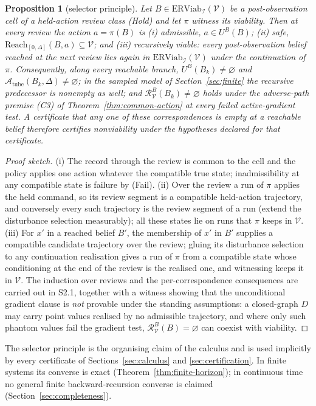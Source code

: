 \documentclass[11pt,a4paper]{article}
\theoremstyle{plain}
\newtheorem{proposition}[theorem]{Proposition}
\theoremstyle{definition}
\theoremstyle{remark}
\newcommand{\ERViab}{\mathrm{ERViab}}
\newcommand{\cV}{\mathcal{V}}
\newcommand{\cI}{\mathcal{I}}
\newcommand{\cR}{\mathcal{R}}
\newcommand{\cA}{\mathcal{A}}
\newcommand{\Atube}{\cA_{\mathrm{tube}}}
\newcommand{\Reach}{\mathrm{Reach}}
\newcommand{\hyp}[1]{\textup{(#1)}}
\begin{document}
\begin{proposition}[selector principle]\label{prop:selector}
Let $B\in\ERViab_\cI(\cV)$ be a post-observation cell of a held-action review class \hyp{Hold} and let $\pi$ witness its viability. Then at every review the action $a=\pi(B)$ is (i) \emph{admissible}, $a\in U^B(B)$; (ii) \emph{safe}, $\Reach_{[0,\Delta]}(B,a)\subseteq\cV$; and (iii) \emph{recursively viable}: every post-observation belief reached at the next review lies again in $\ERViab_\cI(\cV)$ under the continuation of $\pi$. Consequently, along every reachable branch, $U^B(B_k)\ne\varnothing$ and $\Atube(B_k,\Delta)\ne\varnothing$; in the sampled model of Section~\ref{sec:finite} the recursive predecessor is nonempty as well; and $\cR^B_\cV(B_k)\ne\varnothing$ holds under the adverse-path premise \hyp{C3} of Theorem~\ref{thm:common-action} at every failed active-gradient test. A certificate that any one of these correspondences is empty at a reachable belief therefore certifies nonviability under the hypotheses declared for that certificate.
\end{proposition}

\begin{proof}[Proof sketch]
(i) The record through the review is common to the cell and the policy applies one action whatever the compatible true state; inadmissibility at any compatible state is failure by \hyp{Fail}. (ii) Over the review a run of $\pi$ applies the held command, so its review segment is a compatible held-action trajectory, and conversely every such trajectory is the review segment of a run (extend the disturbance selection measurably); all these states lie on runs that $\pi$ keeps in $\cV$. (iii) For $x'$ in a reached belief $B'$, the membership of $x'$ in $B'$ supplies a compatible candidate trajectory over the review; gluing its disturbance selection to any continuation realisation gives a run of $\pi$ from a compatible state whose conditioning at the end of the review is the realised one, and witnessing keeps it in $\cV$. The induction over reviews and the per-correspondence consequences are carried out in S2.1, together with a witness showing that the unconditional gradient clause is \emph{not} provable under the standing assumptions: a closed-graph $D$ may carry point values realised by no admissible trajectory, and where only such phantom values fail the gradient test, $\cR^B_\cV(B)=\varnothing$ can coexist with viability.
\end{proof}

The selector principle is the organising claim of the calculus and is used implicitly by every certificate of Sections~\ref{sec:calculus} and \ref{sec:certification}. In finite systems its converse is exact (Theorem~\ref{thm:finite-horizon}); in continuous time no general finite backward-recursion converse is claimed (Section~\ref{sec:completeness}).
\end{document}
